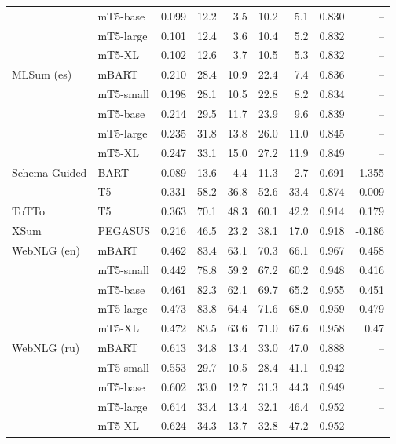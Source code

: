 \documentclass[11pt,a4paper]{article}
\begin{document}
\begin{table*}[!htbp]
\begin{tabular}{@{}llrrrrrrr@{}}
& \small{mT5-base} & 0.099 & 12.2 & 3.5 & 10.2 & 5.1 & 0.830 & -- \\
& \small{mT5-large} & 0.101 & 12.4 & 3.6 & 10.4 & 5.2 & 0.832 & -- \\
& \small{mT5-XL} & 0.102 & 12.6 & 3.7 & 10.5 & 5.3 & 0.832 & -- \\
\small{MLSum (es)} & \small{mBART} & 0.210 & 28.4 & 10.9 & 22.4 & 7.4 & 0.836 & -- \\
& \small{mT5-small} & 0.198 & 28.1 & 10.5 & 22.8 & 8.2 & 0.834 & -- \\
& \small{mT5-base} & 0.214 & 29.5 & 11.7 & 23.9 & 9.6 & 0.839 & -- \\
& \small{mT5-large} & 0.235 & 31.8 & 13.8 & 26.0 & 11.0 & 0.845 & -- \\
& \small{mT5-XL} & 0.247 & 33.1 & 15.0 & 27.2 & 11.9 & 0.849 & -- \\
\midrule
\multirow{2}{*}{Schema-Guided} & \small{BART} & 0.089 & 13.6 & 4.4 & 11.3 & 2.7 & 0.691 & -1.355 \\
 & \small{T5} & 0.331 & 58.2 & 36.8 & 52.6 & 33.4 & 0.874 & 0.009  \\
\midrule
\small{ToTTo} & \small{T5} & 0.363 & 70.1 & 48.3 & 60.1 & 42.2 & 0.914 & 0.179 \\
\midrule
\small{XSum} & \small{PEGASUS} & 0.216 & 46.5 & 23.2 & 38.1 & 17.0 & 0.918 & -0.186 \\
\midrule
\multirow{2}{*}{WebNLG (en)} & \small{mBART} & 0.462 & 83.4 & 63.1 & 70.3 & 66.1 & 0.967 & 0.458 \\
& \small{mT5-small} & 0.442 & 78.8 & 59.2 & 67.2 & 60.2 & 0.948 & 0.416  \\
& \small{mT5-base} & 0.461 & 82.3 & 62.1 & 69.7 & 65.2 & 0.955 & 0.451 \\
& \small{mT5-large} & 0.473 & 83.8 & 64.4 & 71.6 & 68.0 & 0.959 & 0.479 \\
& \small{mT5-XL} & 0.472 & 83.5 & 63.6 & 71.0 & 67.6 & 0.958 & 0.47 \\
\multirow{2}{*}{WebNLG (ru)} & \small{mBART} & 0.613 & 34.8 & 13.4 & 33.0 & 47.0 & 0.888 & -- \\
& \small{mT5-small} & 0.553 & 29.7 & 10.5 & 28.4 & 41.1 & 0.942 & -- \\
& \small{mT5-base} & 0.602 & 33.0 & 12.7 & 31.3 & 44.3 & 0.949 & -- \\
& \small{mT5-large} & 0.614 & 33.4 & 13.4 & 32.1 & 46.4 & 0.952 & -- \\
& \small{mT5-XL} & 0.624 & 34.3 & 13.7 & 32.8 & 47.2 & 0.952 & -- \\

\end{tabular}
\end{table*}
\end{document}
